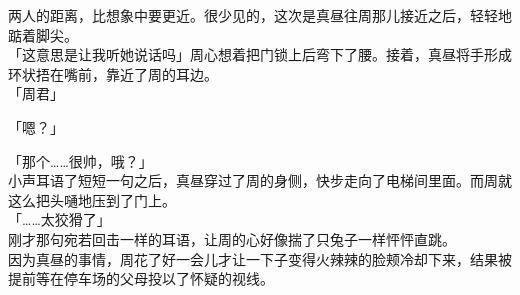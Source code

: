 两人的距离，比想象中要更近。很少见的，这次是真昼往周那儿接近之后，轻轻地踮着脚尖。\\

「这意思是让我听她说话吗」周心想着把门锁上后弯下了腰。接着，真昼将手形成环状捂在嘴前，靠近了周的耳边。\\

「周君」

「嗯？」

「那个……很帅，哦？」\\

小声耳语了短短一句之后，真昼穿过了周的身侧，快步走向了电梯间里面。而周就这么把头嗵地压到了门上。\\

「……太狡猾了」\\

刚才那句宛若回击一样的耳语，让周的心好像揣了只兔子一样怦怦直跳。\\

因为真昼的事情，周花了好一会儿才让一下子变得火辣辣的脸颊冷却下来，结果被提前等在停车场的父母投以了怀疑的视线。
